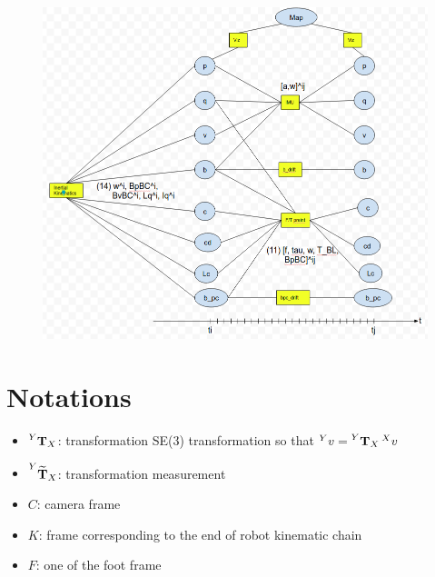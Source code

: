 \documentclass[11pt]{article}
\newcommand{\T}[2]{\prescript{#1}{}{\bfT}_{#2}}
\newcommand{\Tm}[2]{\prescript{#1}{}{\widetilde{\bfT}}_{#2}}
\begin{document}
\begin{figure}[ht]
    \centering
    \includegraphics[width=1\linewidth]{img/HumanoidStateFactorGraph.png}
    \label{fig:my_label}
\end{figure}




















\section{Notations}
\begin{itemize}
    \item $\T{Y}{X}$: transformation SE(3) transformation so that $\prescript{Y}{}{v}=\T{Y}{X}\prescript{X}{}{v}$
    \item $\Tm{Y}{X}$: transformation measurement
    \item $C$: camera frame
    \item $K$: frame corresponding to the end of robot kinematic chain 
    \item $F$: one of the foot frame 
\end{itemize}
\end{document}
